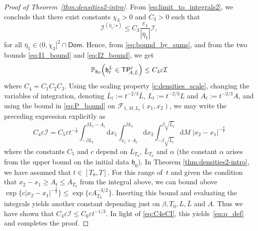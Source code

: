 \documentclass[oneside,final,11pt]{amsart}
\theoremstyle{definition}
\newcounter{assum}
\newcommand{\fh}{\mathfrak{h}}
\newcommand{\TP}[1]{\mathsf{TP}_{\!\!#1}}
\renewcommand{\d}{\mathrm{d}}
\newcommand{\Dom}{\mathsf{Dom}}
\newcommand{\dens}{\CF}
\newcommand{\1}[1]{\mathbf{1}_{#1}}
\newcommand{\eps}{\varepsilon}
\newcommand{\CI}{\mathcal{I}}
\newcommand{\CF}{\mathcal{F}}
\renewcommand{\P}{\mathbb P}
\numberwithin{equation}{section}
\begin{document}
\begin{proof}[Proof of Theorem~\ref{thm:densities2-intro}]
From \eqref{eq:limit_to_integrals2}, we conclude that there exist constants $\chi_3 > 0$ and $C_3 > 0$ such that
\begin{equation}\label{eq:I2_bound}
\CI^{(\bar \eta_1; \star)} \leq C_3 \frac{\eps_1}{|\bar \eta_1|} \CI,
\end{equation}
for all $\bar \eta_1 \in (0,\chi_3]^2 \cap \Dom$. Hence, from  \eqref{eq:bound_by_sums}, and from the two bounds \eqref{eq:I1_bound} and \eqref{eq:I2_bound}, we get
\begin{equation}\label{eq:C4eCI}
	\P_{\fh_0} \Bigl(\fh^L_t \in \TP{A, \bar L}^{\eps}\Bigr) \leq C_4 \eps \CI
\end{equation}
where $C_4 = C_1 C_2 C_3$. Using the scaling property \eqref{e:densities_scale}, changing the variables of integration, denoting $\bar L_t := t^{-2/3} \bar L$, $L_t := t^{-2/3} L$ and $A_t := t^{-2/3} A$, and using the bound in \eqref{eq:P_bound} on $\dens_{1, M, L_t} ( x_1, x_2)$, we may write the preceding expression explicitly as
\begin{equation}
C_4 \eps \CI = C_5 \eps t^{-\frac{1}{3}} \int_{-\beta  L_t}^{\beta L_t - A_t} \d x_1 \int_{x_1 + A_t}^{\beta  L_t} \d x_2 \int_{-\beta \sqrt{\bar L_t}}^{\beta \sqrt{\bar L_t}} \d M\; |x_2 - x_1|^{-\frac{3}{2}}
\end{equation}
where the constants $C_5$ and $c$ depend on $L_{T_0}$, $\bar L_{T_0}$ and $\alpha$ (the constant $\alpha$ arises from the upper bound on the initial data $\fh_0$). In Theorem \ref{thm:densities2-intro}, we have assumed that $t\in [T_0,T]$. For this range of~$t$ and given the condition that $x_2-x_1\geq A_t\leq A_{T_0}$ from the integral above, we can bound above $\exp\big\{c |x_2 - x_1|^{-\frac{3}{2}}\big\} \leq \exp \big\{ c A_{T_0}^{-3/2} \big\}$. Inserting this bound and evaluating the integrals yields another constant depending just on $\beta, T_0, L, \bar{L}$ and $A$. Thus we have shown that
$C_4 \eps \CI \leq C_6 \eps t^{-1 / 3}$. In light of \eqref{eq:C4eCI}, this yields~\eqref{eq:q_def} and completes the proof.

\smallskip


\end{proof}
\end{document}

